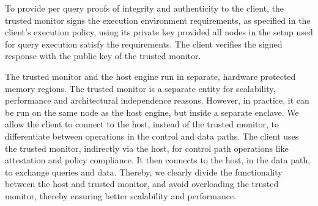  To provide per query proofs of integrity and authenticity to the client, the trusted monitor signs the execution environment requirements, as specified in the client's execution policy, using its private key provided all nodes in the setup used for query execution satisfy the requirements. 
The client verifies the signed response with the public key of the trusted monitor.

The trusted monitor and the host engine run in separate, hardware protected memory regions. The trusted monitor is a separate entity for scalability, performance and architectural independence reasons. 
However, in practice, it can be run on the same node as the host engine, but inside a separate enclave. 
We allow the client to connect to the host, instead of the trusted monitor, to differentiate between operations in the control and data paths. The client uses the trusted monitor, indirectly via the host, for control path operations like attestation and policy compliance. It then connects to the host, in the data path, to exchange queries and data. Thereby, we clearly divide the functionality between the host and trusted monitor, and avoid overloading the trusted monitor, thereby ensuring better scalability and performance.

